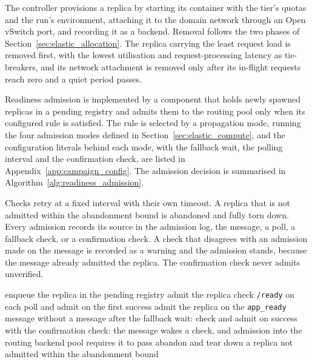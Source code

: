 ﻿\documentclass[12pt,reqno,twoside]{amsbook}
\begin{document}
The controller provisions a replica by starting its container with the tier's
quotas and the run's environment, attaching it to the domain network through an
Open vSwitch port, and recording it as a backend. Removal follows the two phases
of Section~\ref{sec:elastic_allocation}. The replica carrying the least request
load is removed first, with the lowest utilisation and request-processing latency
as tie-breakers, and its network attachment is removed only after its in-flight
requests reach zero and a quiet period passes.

Readiness admission is implemented by a component that holds newly spawned
replicas in a pending registry and admits them to the routing pool only when
its configured rule is satisfied. The rule is selected by a propagation mode,
running the four admission modes defined in
Section~\ref{sec:elastic_compute}, and the configuration literals behind each
mode, with the fallback wait, the polling interval and the confirmation check,
are listed in Appendix~\ref{app:campaign_config}. The admission decision is
summarised in Algorithm~\ref{alg:readiness_admission}.

Checks retry at a fixed interval with their own timeout. A replica that
is not admitted within the abandonment bound is abandoned and fully torn
down. Every admission records its source in the admission log, the
message, a poll, a fallback check, or a confirmation check. A check that
disagrees with an admission made on the message is recorded as a warning
and the admission stands, because the message already admitted the
replica. The confirmation check never admits unverified.


\begin{algorithm}[H]
    \caption{Readiness admission of a spawned compute replica.}
    \label{alg:readiness_admission}
    \begin{algorithmic}[1]
        \State enqueue the replica in the pending registry
            \State admit the replica
            \State check \texttt{/ready} on each poll and admit on the first success
        \Else {}
            \State admit the replica on the \texttt{app\_ready} message
            \State without a message after the fallback wait: check and admit on success
            \State with the confirmation check: the message wakes a check, and admission
            into the routing backend pool requires it to pass
        \EndIf
        \State abandon and tear down a replica not admitted within the abandonment bound
    \end{algorithmic}
\end{algorithm}
\end{document}
